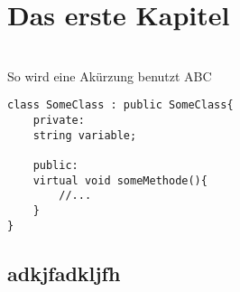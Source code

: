
\chapter{Das erste Kapitel}
\blindtext \\

So wird eine Akürzung benutzt \ac{ABC}\\

\begin{lstlisting}[caption = SomeClass., label=cs:someClass]
class SomeClass : public SomeClass{
	private:
	string variable;
	
	public:
	virtual void someMethode(){
		//...
	}
}
\end{lstlisting}

\clearpage
\blindtext
\section{adkjfadkljfh}
\blindtext
\clearpage
\blindtext
